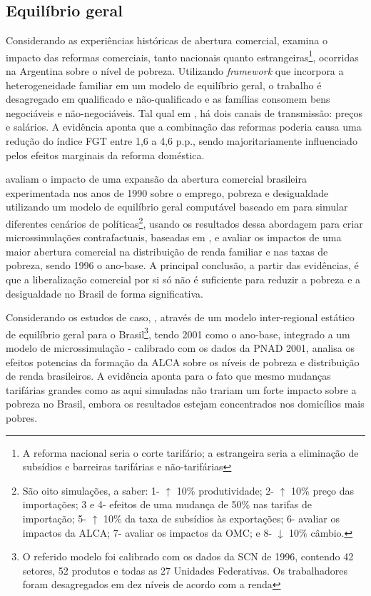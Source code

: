 \subsection{Equilíbrio geral} \label{subsec:eq_geral}

Considerando as experiências históricas de abertura comercial, \textcite{porto03} examina o impacto das reformas comerciais, tanto nacionais quanto estrangeiras\footnote{A reforma nacional seria o corte tarifário; a estrangeira seria a eliminação de subsídios e barreiras tarifárias e não-tarifárias}, ocorridas na Argentina sobre o nível de pobreza. Utilizando \textit{framework} que incorpora a heterogeneidade familiar em um modelo de equilíbrio geral, o trabalho é desagregado em qualificado e não-qualificado e as famílias consomem bens negociáveis e não-negociáveis. Tal qual em \textcite{borrazetal12}, há dois canais de transmissão: preços e salários. A evidência aponta que a combinação das reformas poderia causa uma redução do índice FGT entre 1,6 a 4,6 p.p., sendo majoritariamente influenciado pelos efeitos marginais da reforma doméstica.

\textcite{carneiro06} avaliam o impacto de uma expansão da abertura comercial brasileira experimentada nos anos de 1990 sobre o emprego, pobreza e desigualdade utilizando um modelo de equilíbrio geral computável baseado em \textcite{robinson99} para simular diferentes cenários de políticas\footnote{São oito simulações, a saber: 1- $\uparrow$ 10\% produtividade; 2- $\uparrow$ 10\% preço das importações; 3 e 4- efeitos de uma mudança de 50\% nas tarifas de importação; 5- $\uparrow$ 10\% da taxa de subsídios às exportações; 6- avaliar os impactos da ALCA; 7- avaliar os impactos da OMC; e 8- $\downarrow$ 10\% câmbio.}, usando os resultados dessa abordagem para criar microssimulações contrafactuais, baseadas em \textcite{ganuza07}, e avaliar os impactos de uma maior abertura comercial na distribuição de renda familiar e nas taxas de pobreza, sendo 1996 o ano-base. A principal conclusão, a partir das evidências, é que a liberalização comercial por si só não é suficiente para reduzir a pobreza e a desigualdade no Brasil de forma significativa.

Considerando os estudos de caso, \textcite{ferreira06}, através de um modelo inter-regional estático de equilíbrio geral para o Brasil\footnote{O referido modelo foi calibrado com os dados da SCN de 1996, contendo 42 setores, 52 produtos e todas as 27 Unidades Federativas. Os trabalhadores foram desagregados em dez níveis de acordo com a renda}, tendo 2001 como o ano-base, integrado a um modelo de microssimulação - calibrado com os dados da PNAD 2001, analisa os efeitos potencias da formação da ALCA sobre os níveis de pobreza e distribuição de renda brasileiros. A evidência aponta para o fato que mesmo mudanças tarifárias grandes como as aqui simuladas não trariam um forte impacto sobre
a pobreza no Brasil, embora os resultados estejam concentrados nos domicílios mais pobres.

